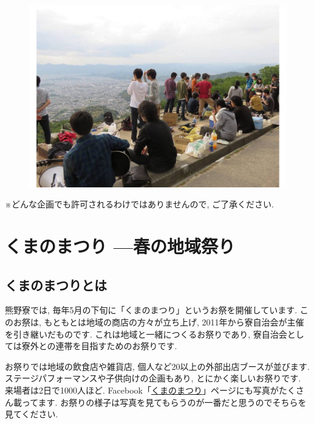 \documentclass[10pt,b5jsbook,dvips,dvipdfmx,openany]{jsbook}
\theoremstyle{definition}
\begin{document}
		
	\begin{figure}
		\includegraphics[scale=0.3]{daimonji_1.pdf}
			\vspace*{-\intextsep}
			\label{fig:大文字}
			\end{figure}

 ※どんな企画でも許可されるわけではありませんので, ご了承ください. 
 
 

 
 
 
 
\newpage

	\section{くまのまつり ---春の地域祭り}

		\subsection{くまのまつりとは}
		熊野寮では, 毎年5月の下旬に「くまのまつり」というお祭を開催しています. このお祭は, もともとは地域の商店の方々が立ち上げ, 2011年から寮自治会が主催を引き継いだものです. これは地域と一緒につくるお祭りであり, 寮自治会としては寮外との連帯を目指すためのお祭りです. 

		お祭りでは地域の飲食店や雑貨店, 個人など20以上の外部出店ブースが並びます. ステージパフォーマンスや子供向けの企画もあり, とにかく楽しいお祭りです. 来場者は2日で1000人ほど. Facebook「\href{https://www.facebook.com/\%e3\%81\%8f\%e3\%81\%be\%e3\%81\%ae\%e3\%81\%be\%e3\%81\%a4\%e3\%82\%8a-789960784504806/}{くまのまつり}」ページにも写真がたくさん載ってます. お祭りの様子は写真を見てもらうのが一番だと思うのでそちらを見てください. 
\end{document}
